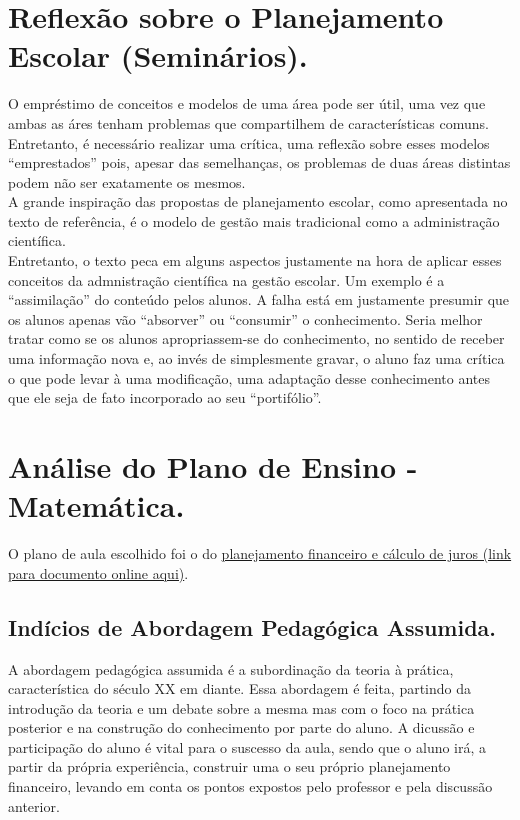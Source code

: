 \documentclass[a4paper,12pt]{article}
\begin{document}
\section{Reflexão sobre o Planejamento Escolar (Seminários).}

O empréstimo de conceitos e modelos de uma área pode ser útil, uma vez que ambas as áres tenham problemas que compartilhem de características comuns. Entretanto, é necessário realizar uma crítica, uma reflexão sobre esses modelos ``emprestados'' pois, apesar das semelhanças, os problemas de duas áreas distintas podem não ser exatamente os mesmos. \\
A grande inspiração das propostas de planejamento escolar, como apresentada no texto de referência, é o modelo de gestão mais tradicional como a administração científica. \\
Entretanto, o texto peca em alguns aspectos justamente na hora de aplicar esses conceitos da admnistração científica na gestão escolar. Um exemplo é a ``assimilação'' do conteúdo pelos alunos. A falha está em justamente presumir que os alunos apenas vão ``absorver'' ou ``consumir'' o conhecimento. Seria melhor tratar como se os alunos apropriassem-se do conhecimento, no sentido de receber uma informação nova e, ao invés de simplesmente gravar, o aluno faz uma crítica o que pode levar à uma modificação, uma adaptação desse conhecimento antes que ele seja de fato incorporado ao seu ``portifólio''.

\section{Análise do Plano de Ensino - Matemática.}

O plano de aula escolhido foi o do \href{http://revistaescola.abril.com.br/ensino-medio/plano-aula-planejamento-financeiro-calculo-juros-646550.shtml}{planejamento financeiro e cálculo de juros (link para documento online aqui)}.


\subsection{Indícios de Abordagem Pedagógica Assumida.}

A abordagem pedagógica assumida é a subordinação da teoria à prática, característica do século XX em diante. Essa abordagem é feita, partindo da introdução da teoria e um debate sobre a mesma mas com o foco na prática posterior e na construção do conhecimento por parte do aluno. A dicussão e participação do aluno é vital para o suscesso da aula, sendo que o aluno irá, a partir da própria experiência, construir uma o seu próprio planejamento financeiro, levando em conta os pontos expostos pelo professor e pela discussão anterior.
\end{document}

